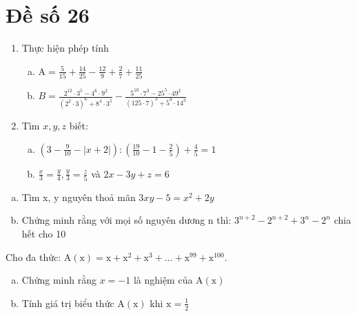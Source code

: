 \onehalfspacing
\section{Đề số 26}

\begin{bt} 
   \begin{enumerate}[1)]
    \item Thực hiện phép tính
    \begin{enumerate}[a.]
        \item $\mathrm{A}=\frac{5}{15}+\frac{14}{25}-\frac{12}{9}+\frac{2}{7}+\frac{11}{25}$
        \item $B=\frac{2^{12} \cdot 3^5-4^6 \cdot 9^2}{\left(2^2 \cdot 3\right)^6+8^4 \cdot 3^5}-\frac{5^{10} \cdot 7^3-25^5 \cdot 49^2}{(125 \cdot 7)^3+5^9 \cdot 14^3}$
    \end{enumerate}
    \item Tìm $x, y, z$ biết:
    \begin{enumerate}[a.]
        \item $\left(3-\frac{9}{10}-|x+2|\right):\left(\frac{19}{10}-1-\frac{2}{5}\right)+\frac{4}{5}=1$ 
        \item $\frac{x}{3}=\frac{y}{4}, \frac{y}{3}=\frac{z}{5}$ và $2 x-3 y+z=6$
    \end{enumerate}
   \end{enumerate}
\loigiai{}
\end{bt}

\begin{bt}
    \hfill
	\begin{enumerate}[a.]
        \item Tìm x, y nguyên thoả mãn $3 x y-5=x^2+2 y$
        \item Chứng minh rằng với mọi số nguyên dương $\mathrm{n}$ thì: $3^{n+2}-2^{n+2}+3^n-2^n$ chia hết cho 10
    \end{enumerate}
	\loigiai{} 
\end{bt}

\begin{bt}
    Cho đa thức: $\mathrm{A}(\mathrm{x})=\mathrm{x}+\mathrm{x}^2+\mathrm{x}^3+\ldots+\mathrm{x}^{99}+\mathrm{x}^{100}$.
    \begin{enumerate}[a.]
        \item Chứng minh rằng $x=-1$ là nghiệm của $\mathrm{A}(\mathrm{x})$
        \item Tính giá trị biểu thức $\mathrm{A}(\mathrm{x})$ khi $\mathrm{x}=\frac{1}{2}$
    \end{enumerate}
	\loigiai{}
\end{bt}

